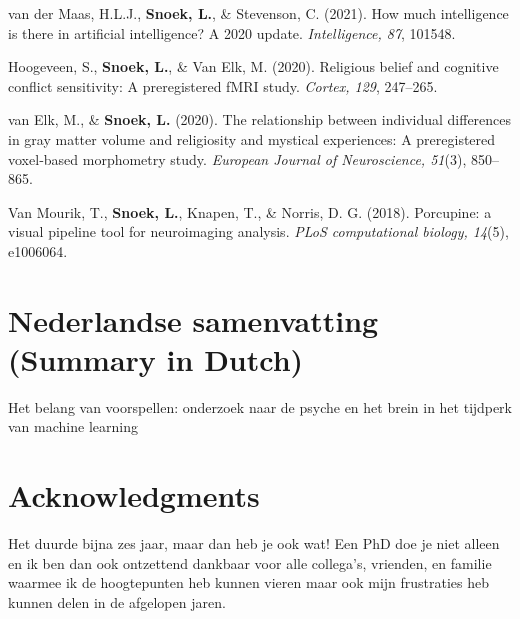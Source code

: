 \documentclass[11pt,american,a4paper,oneside,]{memoir} %
\newenvironment{dutch}[2][]{\begin{otherlanguage}{dutch}}{\end{otherlanguage}}
\begin{document}
van der Maas, H.L.J., \textbf{Snoek, L.}, \& Stevenson, C. (2021). How much intelligence is there in artificial intelligence? A 2020 update. \emph{Intelligence, 87}, 101548.

Hoogeveen, S., \textbf{Snoek, L.}, \& Van Elk, M. (2020). Religious belief and cognitive conflict sensitivity: A preregistered fMRI study. \emph{Cortex, 129}, 247--265.

van Elk, M., \& \textbf{Snoek, L.} (2020). The relationship between individual differences in gray matter volume and religiosity and mystical experiences: A preregistered voxel‐based morphometry study. \emph{European Journal of Neuroscience, 51}(3), 850--865.

Van Mourik, T., \textbf{Snoek, L.}, Knapen, T., \& Norris, D. G. (2018). Porcupine: a visual pipeline tool for neuroimaging analysis. \emph{PLoS computational biology, 14}(5), e1006064.

\normalsize
\setlength{\parindent}{1.5em}

\hypertarget{nederlandse-samenvatting-summary-in-dutch}{%
\chapter*{Nederlandse samenvatting (Summary in Dutch)}\label{nederlandse-samenvatting-summary-in-dutch}}


\begin{dutch}

\emph{Het belang van voorspellen: onderzoek naar de psyche en het brein in het tijdperk van machine learning}

\bigskip

\end{dutch}

\hypertarget{acknowledgments}{%
\chapter*{Acknowledgments}\label{acknowledgments}}


Het duurde bijna zes jaar, maar dan heb je ook wat! Een PhD doe je niet alleen en ik ben dan ook ontzettend dankbaar voor alle collega's, vrienden, en familie waarmee ik de hoogtepunten heb kunnen vieren maar ook mijn frustraties heb kunnen delen in de afgelopen jaren.
\end{document}
